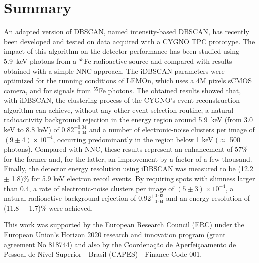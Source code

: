 \documentclass[a4paper,11pt]{article}
\begin{document}

\newpage

\section{Summary}\label{sec:conclusion}

An adapted version of DBSCAN, named intensity-based DBSCAN, has recently been developed and tested on data acquired with a CYGNO TPC prototype. The impact of this algorithm on the detector performance has been studied using 5.9~keV photons from a $^{55}$Fe radioactive source and compared with results obtained with a simple NNC approach.
The iDBSCAN parameters were optimized for the running conditions of LEMOn, which uses a 4M pixels sCMOS camera, and for signals from $^{55}$Fe photons.
The obtained results showed that, with iDBSCAN, the clustering process of the CYGNO's event-reconstruction algorithm can achieve, without any other event-selection routine, a natural radioactivity background rejection in the energy region around 5.9~keV (from 3.0 keV to 8.8 keV) of 0.82$^{+0.04}_{-0.04}$ and a number of electronic-noise clusters per image of $(9 \pm 4)\times 10^{-4}$, occurring predominantly in the region below 1 keV ($\approx$ 500 photons).
Compared with NNC, these results represent an enhancement of 57\% for the former and, for the latter, an improvement by a factor of a few thousand. 
Finally, the detector energy resolution using iDBSCAN was measured to be (12.2 $\pm$ 1.8)\% for 5.9 keV electron recoil events. By requiring spots with slimness larger than 0.4, a rate of electronic-noise clusters per image of $(5 \pm 3)\times 10^{-4}$, a natural radioactive background rejection of 0.92$^{+0.03}_{-0.04}$ and an energy resolution of (11.8 $\pm$ 1.7)\% were achieved.

\acknowledgments
This work was supported by the European Research Council (ERC) under the European Union’s Horizon 2020 research and innovation program (grant agreement No 818744) and also by the Coordenação de Aperfeiçoamento de Pessoal de Nível Superior - Brasil (CAPES) - Finance Code 001.




\end{document}

